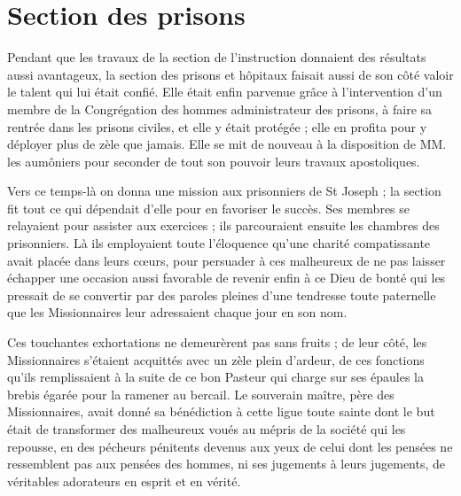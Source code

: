 \section*{Section des prisons}
Pendant que les travaux de la section de l'instruction donnaient des résultats aussi avantageux, la section des prisons et hôpitaux faisait aussi de son côté valoir le talent qui lui était confié. Elle était enfin parvenue grâce à l'intervention d'un membre de la Congrégation des hommes administrateur des prisons, à faire sa rentrée dans les prisons civiles, et elle y était protégée ; elle en profita pour y déployer plus de zèle que jamais. Elle se mit de nouveau à la disposition de MM. les aumôniers pour seconder de tout son pouvoir leurs travaux apostoliques.

Vers ce temps-là on donna une mission aux prisonniers de St Joseph ; la section fit tout ce qui dépendait d'elle pour en favoriser le succès. Ses membres se relayaient pour assister aux exercices ; ils parcouraient ensuite les chambres des prisonniers. Là ils employaient toute l'éloquence qu'une charité
compatissante avait placée dans leurs cœurs, pour persuader à ces malheureux de ne pas laisser échapper une occasion aussi favorable de revenir enfin à ce Dieu de bonté qui les pressait de se convertir par des paroles pleines d'une tendresse toute paternelle que les Missionnaires leur adressaient chaque jour en son nom.

Ces touchantes exhortations ne demeurèrent pas sans fruits ; de leur côté, les Missionnaires s'étaient acquittés avec un zèle plein d'ardeur, de ces fonctions qu'ils remplissaient à la suite de ce bon Pasteur qui charge sur ses épaules la brebis égarée pour la ramener au bercail. Le souverain maître, père des Missionnaires, avait donné sa bénédiction à cette ligue toute sainte dont le but était de transformer des malheureux voués au mépris de la société qui les repousse, en des pécheurs pénitents devenus aux yeux de celui dont les pensées ne ressemblent pas aux pensées des hommes, ni ses jugements à leurs jugements, de véritables adorateurs en esprit et en vérité.

